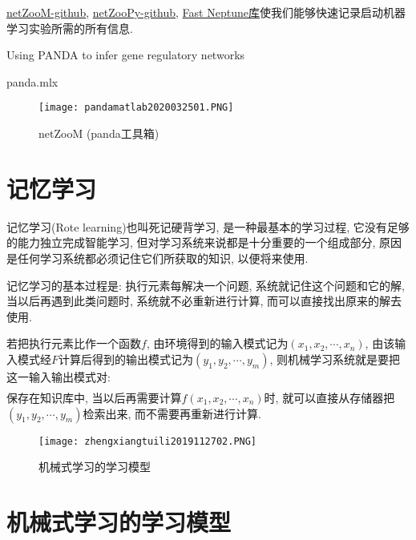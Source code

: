 \href{https://github.com/netZoo/netZooM}{netZooM-github}, \href{https://github.com/netZoo/netZooPy}{netZooPy-github}, \href{https://github.com/DanyWind/fast_neptune}{Fast Neptune库}使我们能够快速记录启动机器学习实验所需的所有信息.

Using PANDA to infer gene regulatory networks

panda.mlx
\begin{figure}[H]
\centering
\texttt{[image: pandamatlab2020032501.PNG]}
\caption{netZooM (panda工具箱)}
\label{pandamatlab2020032501}
\end{figure}

\section{记忆学习}

记忆学习(Rote learning)也叫死记硬背学习, 是一种最基本的学习过程, 它没有足够的能力独立完成智能学习, 但对学习系统来说都是十分重要的一个组成部分, 原因是任何学习系统都必须记住它们所获取的知识, 以便将来使用.

记忆学习的基本过程是: 执行元素每解决一个问题, 系统就记住这个问题和它的解, 当以后再遇到此类问题时, 系统就不必重新进行计算, 而可以直接找出原来的解去使用.

若把执行元素比作一个函数$f$, 由环境得到的输入模式记为$(x_1,x_2,\cdots ,x_n)$, 由该输入模式经$F$计算后得到的输出模式记为$(y_1,y_2,\cdots ,y_m)$, 则机械学习系统就是要把这一输入输出模式对:
\begin{align}
  [(x_1,x_2,\cdots ,x_n) , (y_1,y_2,\cdots ,y_m)]
\end{align}
保存在知识库中, 当以后再需要计算$f(x_1,x_2,\cdots ,x_n)$时, 就可以直接从存储器把$(y_1,y_2,\cdots ,y_m)$检索出来, 而不需要再重新进行计算.
\begin{figure}[H]
\centering
\texttt{[image: zhengxiangtuili2019112702.PNG]}
\caption{机械式学习的学习模型}
\label{AI32fig2702}
\end{figure}
\section{机械式学习的学习模型}
